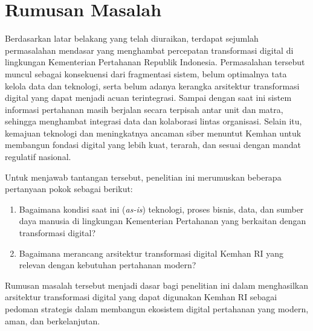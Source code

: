 \section{Rumusan Masalah}
Berdasarkan latar belakang yang telah diuraikan, terdapat sejumlah permasalahan mendasar yang menghambat percepatan transformasi digital di lingkungan Kementerian Pertahanan Republik Indonesia.
Permasalahan tersebut muncul sebagai konsekuensi dari fragmentasi sistem, belum optimalnya tata kelola data dan teknologi, serta belum adanya kerangka arsitektur transformasi digital yang dapat menjadi acuan terintegrasi.
Sampai dengan saat ini sistem informasi pertahanan masih berjalan secara terpisah antar unit dan matra, sehingga menghambat integrasi data dan kolaborasi lintas organisasi.
Selain itu, kemajuan teknologi dan meningkatnya ancaman siber menuntut Kemhan untuk membangun fondasi digital yang lebih kuat, terarah, dan sesuai dengan mandat regulatif nasional.

Untuk menjawab tantangan tersebut, penelitian ini merumuskan beberapa pertanyaan pokok sebagai berikut:
\begin{enumerate}
\item	Bagaimana kondisi saat ini (\textit{as-is}) teknologi, proses bisnis, data, dan sumber daya manusia di lingkungan Kementerian Pertahanan yang berkaitan dengan transformasi digital?
\item	Bagaimana merancang arsitektur transformasi digital Kemhan RI yang relevan dengan kebutuhan pertahanan modern?
\end{enumerate}
Rumusan masalah tersebut menjadi dasar bagi penelitian ini dalam menghasilkan arsitektur transformasi digital yang dapat digunakan Kemhan RI sebagai pedoman strategis dalam membangun ekosistem digital pertahanan yang modern, aman, dan berkelanjutan.

